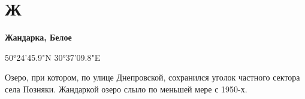 \chapter*{Ж}

\textbf{Жандарка, Белое}

50°24'45.9"N 30°37'09.8"E

Озеро, при котором, по улице Днепровской, сохранился уголок частного сектора села Позняки. Жандаркой озеро слыло по меньшей мере с 1950-х.